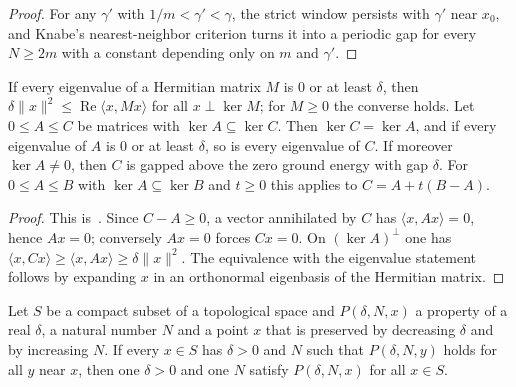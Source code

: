 \begin{proof}
    \leanok
    For any $\gamma'$ with $1/m<\gamma'<\gamma$, the strict window persists
    with $\gamma'$ near $x_0$, and Knabe's nearest-neighbor criterion turns it
    into a periodic gap for every $N\geq2m$ with a constant depending only on
    $m$ and $\gamma'$.
\end{proof}

\begin{lemma}
    \label{thm:common_kernel_spectral_gap_interpolation}
    \leanok
    If every eigenvalue of a Hermitian matrix $M$ is $0$ or at least $\delta$,
    then $\delta\lVert x\rVert^2\leq\operatorname{Re}\langle x,Mx\rangle$ for
    all $x\perp\ker M$; for $M\geq0$ the converse holds. Let $0\leq A\leq C$
    be matrices with $\ker A\subseteq\ker C$. Then $\ker C=\ker A$, and if
    every eigenvalue of $A$ is $0$ or at least $\delta$, so is every
    eigenvalue of $C$. If moreover $\ker A\neq0$, then $C$ is gapped above
    the zero ground energy with gap $\delta$. For $0\leq A\leq B$ with
    $\ker A\subseteq\ker B$ and $t\geq0$ this applies to $C=A+t(B-A)$.
\end{lemma}

\begin{proof}
    \leanok
    This is~\cite[``The spectrum above the kernel'' and ``A larger matrix
        with the same kernel keeps the gap'']{QICLean2026Blueprint}.
    Since $C-A\geq0$, a vector annihilated by $C$ has
    $\langle x,Ax\rangle=0$, hence $Ax=0$; conversely $Ax=0$ forces $Cx=0$.
    On $(\ker A)^\perp$ one has
    $\langle x,Cx\rangle\geq\langle x,Ax\rangle\geq\delta\lVert x\rVert^2$.
    The equivalence with the eigenvalue statement follows by expanding $x$ in
    an orthonormal eigenbasis of the Hermitian matrix.
\end{proof}

\begin{lemma}
    \label{lem:compact_uniform_pos_nat_bounds}
    \leanok
    Let $S$ be a compact subset of a topological space and $P(\delta,N,x)$ a
    property of a real $\delta$, a natural number $N$ and a point $x$ that is
    preserved by decreasing $\delta$ and by increasing $N$. If every $x\in S$
    has $\delta>0$ and $N$ such that $P(\delta,N,y)$ holds for all $y$ near $x$,
    then one $\delta>0$ and one $N$ satisfy $P(\delta,N,x)$ for all $x\in S$.
\end{lemma}

